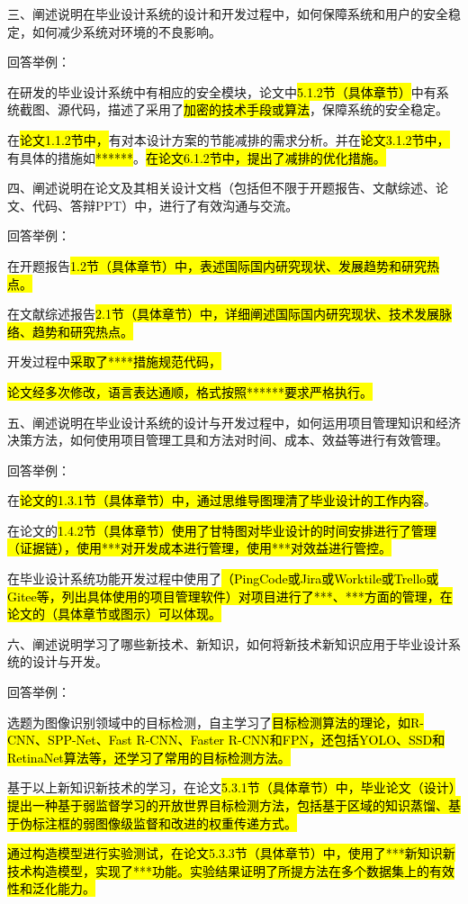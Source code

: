 \documentclass[
]{article}
\begin{document}
三、阐述说明在毕业设计系统的设计和开发过程中，如何保障系统和用户的安全稳定，如何减少系统对环境的不良影响。

回答举例：

在研发的毕业设计系统中有相应的安全模块，论文中\hl{5.1.2节（具体章节）}中有系统截图、源代码，描述了采用了\hl{加密的技术手段或算法}，保障系统的安全稳定。

在\hl{论文1.1.2节中，}有对本设计方案的节能减排的需求分析。并在\hl{论文3.1.2节中，}有具体的措施如\hl{******}。\hl{在论文6.1.2节中，提出了减排的优化措施。}

四、阐述说明在论文及其相关设计文档（包括但不限于开题报告、文献综述、论文、代码、答辩PPT）中，进行了有效沟通与交流。

回答举例：

在开题报告\hl{1.2节（具体章节）中，表述国际国内研究现状、发展趋势和研究热点。}

在文献综述报告\hl{2.1节（具体章节）中，详细阐述国际国内研究现状、技术发展脉络、趋势和研究热点。}

开发过程中\hl{采取了****措施规范代码，}

\hl{论文经多次修改，语言表达通顺，格式按照******要求严格执行。}

五、阐述说明在毕业设计系统的设计与开发过程中，如何运用项目管理知识和经济决策方法，如何使用项目管理工具和方法对时间、成本、效益等进行有效管理。

回答举例：

在\hl{论文的1.3.1节（具体章节）中，通过思维导图理清了毕业设计的工作内容}。

在论文的\hl{1.4.2节（具体章节）使用了甘特图对毕业设计的时间安排进行了管理（证据链），使用***对开发成本进行管理，使用***对效益进行管控。}

在毕业设计系统功能开发过程中使用了\hl{（PingCode或Jira或Worktile或Trello或Gitee等，列出具体使用的项目管理软件）对项目进行了***、***方面的管理，在论文的（具体章节或图示）可以体现。}

六、阐述说明学习了哪些新技术、新知识，如何将新技术新知识应用于毕业设计系统的设计与开发。

回答举例：

选题为图像识别领域中的目标检测，自主学习了\hl{目标检测算法的理论，如R-CNN、SPP-Net、Fast
R-CNN、Faster
R-CNN和FPN，还包括YOLO、SSD和RetinaNet算法等，还学习了常用的目标检测方法。}

基于以上新知识新技术的学习，在论文\hl{5.3.1节（具体章节）中，毕业论文（设计）提出一种基于弱监督学习的开放世界目标检测方法，包括基于区域的知识蒸馏、基于伪标注框的弱图像级监督和改进的权重传递方式。}

\hl{通过构造模型进行实验测试，在论文5.3.3节（具体章节）中，使用了***新知识新技术构造模型，实现了***功能。实验结果证明了所提方法在多个数据集上的有效性和泛化能力。}
\end{document}

